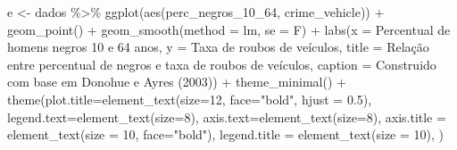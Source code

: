 \documentclass[
]{article}
\newenvironment{Shaded}{\begin{snugshade}}{\end{snugshade}}
\newcommand{\AttributeTok}[1]{\textcolor[rgb]{0.77,0.63,0.00}{#1}}
\newcommand{\DecValTok}[1]{\textcolor[rgb]{0.00,0.00,0.81}{#1}}
\newcommand{\FloatTok}[1]{\textcolor[rgb]{0.00,0.00,0.81}{#1}}
\newcommand{\FunctionTok}[1]{\textcolor[rgb]{0.00,0.00,0.00}{#1}}
\newcommand{\NormalTok}[1]{#1}
\newcommand{\OtherTok}[1]{\textcolor[rgb]{0.56,0.35,0.01}{#1}}
\newcommand{\SpecialCharTok}[1]{\textcolor[rgb]{0.00,0.00,0.00}{#1}}
\newcommand{\StringTok}[1]{\textcolor[rgb]{0.31,0.60,0.02}{#1}}
\begin{document}
\begin{Shaded}
\begin{Highlighting}[]
\NormalTok{e }\OtherTok{\textless{}{-}}\NormalTok{ dados }\SpecialCharTok{\%\textgreater{}\%} 
  \FunctionTok{ggplot}\NormalTok{(}\FunctionTok{aes}\NormalTok{(perc\_negros\_10\_64, crime\_vehicle)) }\SpecialCharTok{+}
  \FunctionTok{geom\_point}\NormalTok{() }\SpecialCharTok{+} 
  \FunctionTok{geom\_smooth}\NormalTok{(}\AttributeTok{method =} \StringTok{\textquotesingle{}lm\textquotesingle{}}\NormalTok{, }\AttributeTok{se =}\NormalTok{ F) }\SpecialCharTok{+}
  \FunctionTok{labs}\NormalTok{(}\AttributeTok{x =} \StringTok{\textquotesingle{}Percentual de homens negros 10 e 64 anos\textquotesingle{}}\NormalTok{,}
       \AttributeTok{y =} \StringTok{\textquotesingle{}Taxa de roubos de veículos\textquotesingle{}}\NormalTok{,}
       \AttributeTok{title =} \StringTok{\textquotesingle{}Relação entre percentual de negros e taxa de roubos de veículos\textquotesingle{}}\NormalTok{,}
       \AttributeTok{caption =} \StringTok{\textquotesingle{}Construido com base em Donohue e Ayres (2003)\textquotesingle{}}\NormalTok{) }\SpecialCharTok{+} 
  \FunctionTok{theme\_minimal}\NormalTok{() }\SpecialCharTok{+}
  \FunctionTok{theme}\NormalTok{(}\AttributeTok{plot.title=}\FunctionTok{element\_text}\NormalTok{(}\AttributeTok{size=}\DecValTok{12}\NormalTok{, }\AttributeTok{face=}\StringTok{"bold"}\NormalTok{, }\AttributeTok{hjust =} \FloatTok{0.5}\NormalTok{),}
        \AttributeTok{legend.text=}\FunctionTok{element\_text}\NormalTok{(}\AttributeTok{size=}\DecValTok{8}\NormalTok{),}
        \AttributeTok{axis.text=}\FunctionTok{element\_text}\NormalTok{(}\AttributeTok{size=}\DecValTok{8}\NormalTok{),}
        \AttributeTok{axis.title =} \FunctionTok{element\_text}\NormalTok{(}\AttributeTok{size =} \DecValTok{10}\NormalTok{, }\AttributeTok{face=}\StringTok{"bold"}\NormalTok{),}
        \AttributeTok{legend.title =} \FunctionTok{element\_text}\NormalTok{(}\AttributeTok{size =} \DecValTok{10}\NormalTok{),}
\NormalTok{        )}
  

\end{Highlighting}
\end{Shaded}
\end{document}
